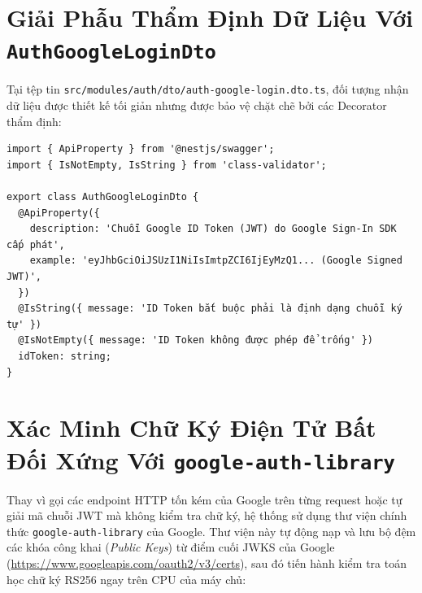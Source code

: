 \documentclass[12pt,a4paper,oneside]{book}
\begin{document}
\section{Giải Phẫu Thẩm Định Dữ Liệu Với \texttt{AuthGoogleLoginDto}}
Tại tệp tin \texttt{src/modules/auth/dto/auth-google-login.dto.ts}, đối tượng nhận dữ liệu được thiết kế tối giản nhưng được bảo vệ chặt chẽ bởi các Decorator thẩm định:

\begin{codebox}
\begin{Verbatim}[fontsize=\small]
import { ApiProperty } from '@nestjs/swagger';
import { IsNotEmpty, IsString } from 'class-validator';

export class AuthGoogleLoginDto {
  @ApiProperty({
    description: 'Chuỗi Google ID Token (JWT) do Google Sign-In SDK cấp phát',
    example: 'eyJhbGciOiJSUzI1NiIsImtpZCI6IjEyMzQ1... (Google Signed JWT)',
  })
  @IsString({ message: 'ID Token bắt buộc phải là định dạng chuỗi ký tự' })
  @IsNotEmpty({ message: 'ID Token không được phép để trống' })
  idToken: string;
}
\end{Verbatim}
\end{codebox}

\section{Xác Minh Chữ Ký Điện Tử Bất Đối Xứng Với \texttt{google-auth-library}}
Thay vì gọi các endpoint HTTP tốn kém của Google trên từng request hoặc tự giải mã chuỗi JWT mà không kiểm tra chữ ký, hệ thống sử dụng thư viện chính thức \texttt{google-auth-library} của Google. Thư viện này tự động nạp và lưu bộ đệm các khóa công khai (\textit{Public Keys}) từ điểm cuối JWKS của Google (\url{https://www.googleapis.com/oauth2/v3/certs}), sau đó tiến hành kiểm tra toán học chữ ký RS256 ngay trên CPU của máy chủ:
\end{document}
